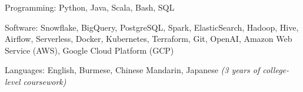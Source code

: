 

\begin{cvskills}

  \cvskill
  {Programming:} %
  {Python, Java, Scala, Bash, SQL}

  \cvskill
  {Software:} %
  {Snowflake, BigQuery, PostgreSQL, Spark, ElasticSearch, Hadoop, Hive, Airflow, Serverless, Docker, Kubernetes, Terraform, Git, OpenAI, Amazon Web Service (AWS), Google Cloud Platform (GCP)} %

  \cvskill
  {Languages:} %
  {English, Burmese, Chinese Mandarin, Japanese \bodyfontlight\emph{(3 years of college-level coursework)}} %

\end{cvskills}
